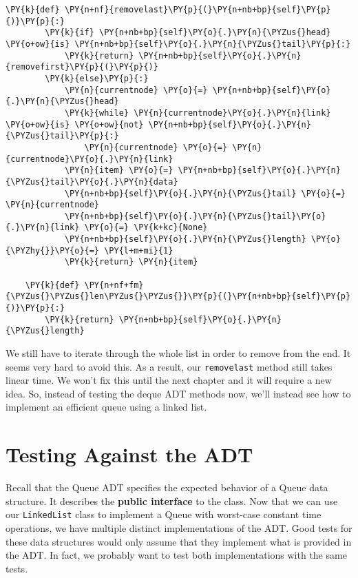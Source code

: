 \begin{Verbatim}[commandchars=\\\{\}]
    \PY{k}{def} \PY{n+nf}{removelast}\PY{p}{(}\PY{n+nb+bp}{self}\PY{p}{)}\PY{p}{:}
        \PY{k}{if} \PY{n+nb+bp}{self}\PY{o}{.}\PY{n}{\PYZus{}head} \PY{o+ow}{is} \PY{n+nb+bp}{self}\PY{o}{.}\PY{n}{\PYZus{}tail}\PY{p}{:}
            \PY{k}{return} \PY{n+nb+bp}{self}\PY{o}{.}\PY{n}{removefirst}\PY{p}{(}\PY{p}{)}
        \PY{k}{else}\PY{p}{:}
            \PY{n}{currentnode} \PY{o}{=} \PY{n+nb+bp}{self}\PY{o}{.}\PY{n}{\PYZus{}head}
            \PY{k}{while} \PY{n}{currentnode}\PY{o}{.}\PY{n}{link} \PY{o+ow}{is} \PY{o+ow}{not} \PY{n+nb+bp}{self}\PY{o}{.}\PY{n}{\PYZus{}tail}\PY{p}{:}
                \PY{n}{currentnode} \PY{o}{=} \PY{n}{currentnode}\PY{o}{.}\PY{n}{link}
            \PY{n}{item} \PY{o}{=} \PY{n+nb+bp}{self}\PY{o}{.}\PY{n}{\PYZus{}tail}\PY{o}{.}\PY{n}{data}
            \PY{n+nb+bp}{self}\PY{o}{.}\PY{n}{\PYZus{}tail} \PY{o}{=} \PY{n}{currentnode}
            \PY{n+nb+bp}{self}\PY{o}{.}\PY{n}{\PYZus{}tail}\PY{o}{.}\PY{n}{link} \PY{o}{=} \PY{k+kc}{None}
            \PY{n+nb+bp}{self}\PY{o}{.}\PY{n}{\PYZus{}length} \PY{o}{\PYZhy{}}\PY{o}{=} \PY{l+m+mi}{1}
            \PY{k}{return} \PY{n}{item}

    \PY{k}{def} \PY{n+nf+fm}{\PYZus{}\PYZus{}len\PYZus{}\PYZus{}}\PY{p}{(}\PY{n+nb+bp}{self}\PY{p}{)}\PY{p}{:}
        \PY{k}{return} \PY{n+nb+bp}{self}\PY{o}{.}\PY{n}{\PYZus{}length}
\end{Verbatim}



We still have to iterate through the whole list in order to remove from the end.
It seems very hard to avoid this.
As a result, our \texttt{removelast} method still takes linear time.
We won't fix this until the next chapter and it will require a new idea.
So, instead of testing the deque ADT methods now, we'll instead see how to implement an efficient queue using a linked list.

\section{Testing Against the ADT}


Recall that the Queue ADT specifies the expected behavior of a Queue data structure.
It describes the \textbf{public interface} to the class.
Now that we can use our \texttt{LinkedList} class to implement a Queue with worst-case constant time operations, we have multiple distinct implementations of the ADT.
Good tests for these data structures would only assume that they implement what is provided in the ADT.
In fact, we probably want to test both implementations with the same tests.


